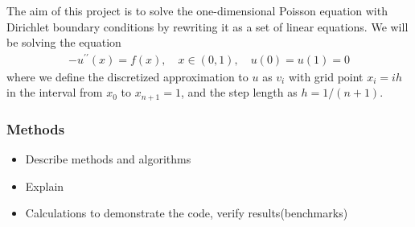\documentclass[12pt]{article}
\begin{document}
\noindent The aim of this project is to solve the one-dimensional Poisson equation with Dirichlet boundary conditions by rewriting it as a set of linear equations. We will be solving the equation
\begin{align*}
-u^{\prime \prime}(x) = f(x), \quad x \in (0,1), \quad  u(0) = u(1) = 0
\end{align*}
where we define the discretized approximation to $u$ as $v_i$ with grid point $x_i = ih$ in the interval from $x_0$ to $x_{n+1} = 1$, and the step length as $h = 1/(n+1)$.


\subsubsection*{Methods}

\begin{itemize}
\item Describe methods and algorithms
\item Explain
\item Calculations to demonstrate the code, verify results(benchmarks)
\end{itemize}
\end{document}
